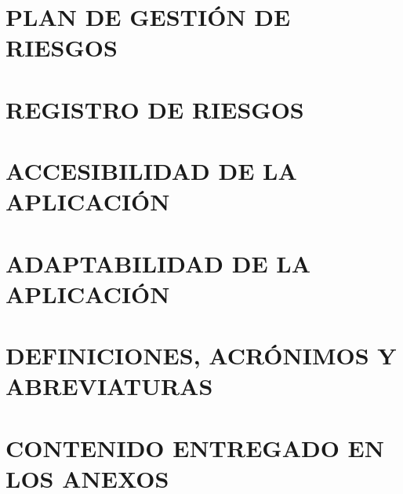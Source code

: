 \section*{PLAN DE GESTIÓN DE RIESGOS}
{}
\hypertarget{anexo:plan_de_gestion_de_riesgos}{}


\newpage
\section*{REGISTRO DE RIESGOS}
{}
\hypertarget{anexo:registro_de_riesgos}{}


\newpage
\section*{ACCESIBILIDAD DE LA APLICACIÓN}
{}


\newpage
\section*{ADAPTABILIDAD DE LA APLICACIÓN}
{}



\newpage
\section*{DEFINICIONES, ACRÓNIMOS Y ABREVIATURAS}
{}


\newpage
\section*{CONTENIDO ENTREGADO EN LOS ANEXOS} 


